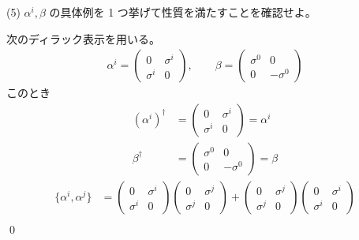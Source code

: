 \documentclass[uplatex,dvipdfmx,a4paper,11pt]{jlreq}
\makeatletter
\theoremstyle{definition}
\renewenvironment{proof}[1][\proofname]{\par
  \normalfont
  \topsep6\p@\@plus6\p@ \trivlist
  \item[\hskip\labelsep{\bfseries #1}\@addpunct{\bfseries}]\ignorespaces\quad\par
}{%
  \qed\endtrivlist\@endpefalse
}
\renewcommand\proofname{証明}
\makeatother
\begin{document}
(5) $\alpha^i, \beta$ の具体例を 1 つ挙げて性質を満たすことを確認せよ。
\begin{proof}
  次のディラック表示を用いる。
  \begin{align}
    \alpha^i = \begin{pmatrix}
                 0        & \sigma^i \\
                 \sigma^i & 0
               \end{pmatrix}, \qquad
    \beta = \begin{pmatrix}
              \sigma^0 & 0         \\
              0        & -\sigma^0
            \end{pmatrix}
  \end{align}
  このとき
  \begin{align}
    (\alpha^i)^\dagger & = \begin{pmatrix}
                             0        & \sigma^i \\
                             \sigma^i & 0
                           \end{pmatrix} = \alpha^i \\
    \beta^\dagger      & = \begin{pmatrix}
                             \sigma^0 & 0         \\
                             0        & -\sigma^0
                           \end{pmatrix} = \beta
  \end{align}
  \begin{align}
    \lbrace\alpha^i, \alpha^j\rbrace & = \begin{pmatrix}
                                           0        & \sigma^i \\
                                           \sigma^i & 0
                                         \end{pmatrix}
    \begin{pmatrix}
      0        & \sigma^j \\
      \sigma^j & 0
    \end{pmatrix} +
    \begin{pmatrix}
      0        & \sigma^j \\
      \sigma^j & 0
    \end{pmatrix}
    \begin{pmatrix}
      0        & \sigma^i \\
      \sigma^i & 0
    \end{pmatrix}                                                                                                                           \\

\end{align}
\end{proof}
\end{document}
